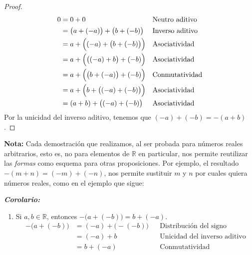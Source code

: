 \documentclass[11pt]{article}
\newcommand{\R}{\mathbb{R}}
\newcommand{\bfit}[1]{\textbf{\textit{#1}}}
\begin{document}
\begin{enumerate}[label=\alph*)]
    \vspace{-1em}\begin{proof} 
        \begin{align*}
            0 &= 0 + 0 && \text{Neutro aditivo} \\
            &= \bigl(a+(-a)\bigr) + \bigl(b + (-b)\bigr) && \text{Inverso aditivo} \\
            &= a + \Bigl((-a)+ \bigl(b + (-b)\bigr)\Bigr) && \text{Asociatividad} \\
            &= a + \Bigl( \bigl((-a)+b\bigr) +(-b)\Bigr) && \text{Asociatividad} \\
            &= a + \Bigl( \bigl(b+(-a)\bigr) +(-b)\Bigr) && \text{Conmutatividad} \\
            &= a + \Bigl( b + \bigl( (-a)+(-b) \bigr) \Bigr) && \text{Asociatividad} \\
            &= (a+b) + \bigl((-a)+ (-b)\bigr) && \text{Asociatividad}
            \end{align*}
            Por la unicidad del inverso aditivo, tenemos que $(-a)+ (-b)=-(a+b)$.\qedhere    
    \end{proof} \vspace{-1em}

    \textbf{Nota:} Cada demostración que realizamos, al ser probada para números reales arbitrarios, esto es, no para elementos de $\R$ en particular, nos permite reutilizar las \textit{formas} como esquema para otras proposiciones. Por ejemplo, el resultado $-(m+n)=(-m)+(-n)$, nos permite sustituir $m$ y $n$ por cuales quiera números reales, como en el ejemplo que sigue:

    \bfit{Corolario:} \begin{enumerate}[label=\roman*)]
        \item Si $a,b\in \R$, entonces $-\bigl(a+(-b)\bigr)=b+(-a)$.
        \begin{align*}
        -\bigl(a+(-b)\bigr)&= (-a) + \bigl(-(-b)\bigr) &&\text{Distribución del signo} \\
        &= (-a) + b &&\text{Unicidad del inverso aditivo} \\
        &= b +(-a) &&\text{Conmutatividad}
        \end{align*}
    \end{enumerate} %


\end{enumerate}
\end{document}
